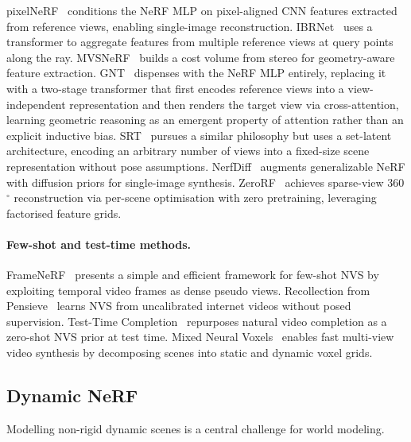 pixelNeRF~\citep{yu2021pixelnerf} conditions the NeRF MLP on pixel-aligned
CNN features extracted from reference views, enabling single-image reconstruction.
IBRNet~\citep{wang2021ibrnet} uses a transformer to aggregate features from
multiple reference views at query points along the ray.
MVSNeRF~\citep{chen2021mvsnerf} builds a cost volume from stereo for
geometry-aware feature extraction.
GNT~\citep{wang2022gnt} dispenses with the NeRF MLP entirely, replacing it
with a two-stage transformer that first encodes reference views into a
view-independent representation and then renders the target view via
cross-attention, learning geometric reasoning as an emergent property of
attention rather than an explicit inductive bias.
SRT~\citep{sajjadi2022srt} pursues a similar philosophy but uses a
set-latent architecture, encoding an arbitrary number of views into a
fixed-size scene representation without pose assumptions.
NerfDiff~\citep{gu2023nerfdiff} augments generalizable NeRF with diffusion
priors for single-image synthesis.
ZeroRF~\citep{shi2023zerorf} achieves sparse-view 360$^\circ$ reconstruction
via per-scene optimisation with zero pretraining, leveraging factorised feature grids.

\paragraph{Few-shot and test-time methods.}
FrameNeRF~\citep{yan2024framenerf} presents a simple and efficient framework
for few-shot NVS by exploiting temporal video frames as dense pseudo views.
Recollection from Pensieve~\citep{zhou2024pensieve} learns NVS from uncalibrated
internet videos without posed supervision.
Test-Time Completion~\citep{bao2024tttcompletion} repurposes natural video
completion as a zero-shot NVS prior at test time.
Mixed Neural Voxels~\citep{wang2023mixedvoxels} enables fast multi-view video
synthesis by decomposing scenes into static and dynamic voxel grids.

\subsection{Dynamic NeRF}

Modelling non-rigid dynamic scenes is a central challenge for world modeling.

